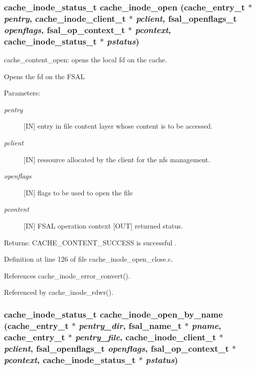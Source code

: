 \subsubsection{\setlength{\rightskip}{0pt plus 5cm}cache\_\-inode\_\-status\_\-t cache\_\-inode\_\-open (cache\_\-entry\_\-t $\ast$ {\em pentry}, cache\_\-inode\_\-client\_\-t $\ast$ {\em pclient}, fsal\_\-openflags\_\-t {\em openflags}, fsal\_\-op\_\-context\_\-t $\ast$ {\em pcontext}, cache\_\-inode\_\-status\_\-t $\ast$ {\em pstatus})}\label{cache__inode__open__close_8c_a0}


cache\_\-content\_\-open: opens the local fd on the cache.

Opens the fd on the FSAL

\begin{Desc}
\item[Parameters:]
\begin{description}
\item[{\em pentry}][IN] entry in file content layer whose content is to be accessed. \item[{\em pclient}][IN] ressource allocated by the client for the nfs management. \item[{\em openflags}][IN] flags to be used to open the file \item[{\em pcontent}][IN] FSAL operation context  [OUT] returned status.\end{description}
\end{Desc}
\begin{Desc}
\item[Returns:]CACHE\_\-CONTENT\_\-SUCCESS is successful . \end{Desc}


Definition at line 126 of file cache\_\-inode\_\-open\_\-close.c.

References cache\_\-inode\_\-error\_\-convert().

Referenced by cache\_\-inode\_\-rdwr().
\subsubsection{\setlength{\rightskip}{0pt plus 5cm}cache\_\-inode\_\-status\_\-t cache\_\-inode\_\-open\_\-by\_\-name (cache\_\-entry\_\-t $\ast$ {\em pentry\_\-dir}, fsal\_\-name\_\-t $\ast$ {\em pname}, cache\_\-entry\_\-t $\ast$ {\em pentry\_\-file}, cache\_\-inode\_\-client\_\-t $\ast$ {\em pclient}, fsal\_\-openflags\_\-t {\em openflags}, fsal\_\-op\_\-context\_\-t $\ast$ {\em pcontext}, cache\_\-inode\_\-status\_\-t $\ast$ {\em pstatus})}\label{cache__inode__open__close_8c_a1}


